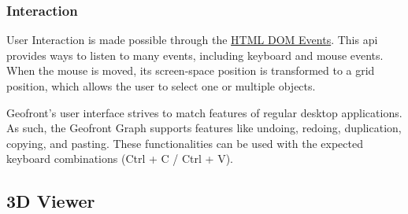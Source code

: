 \subsubsection{Interaction}
User Interaction is made possible through the \href{https://developer.mozilla.org/en-US/docs/web/api/event}{HTML DOM Events}. 
This api provides ways to listen to many events, including keyboard and mouse events. 
When the mouse is moved, its screen-space position is transformed to a grid position, which allows the user to select one or multiple objects. 

Geofront's user interface strives to match features of regular desktop applications. 
As such, the Geofront Graph supports features like undoing, redoing, duplication, copying, and pasting. 
These functionalities can be used with the expected keyboard combinations (Ctrl + C / Ctrl + V).







\subsection{3D Viewer}

